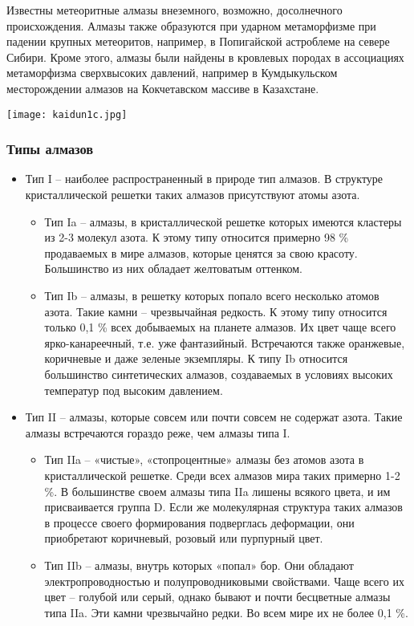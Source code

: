 \documentclass{beamer}
\begin{document}
 \begin{frame}
 Известны метеоритные алмазы внеземного, возможно, досолнечного происхождения. Алмазы также образуются при ударном метаморфизме при падении крупных метеоритов, например, в Попигайской астроблеме на севере Сибири.
Кроме этого, алмазы были найдены в кровлевых породах в ассоциациях метаморфизма сверхвысоких давлений, например в Кумдыкульском месторождении алмазов на Кокчетавском массиве в Казахстане.\par
 \centering\texttt{[image: kaidun1c.jpg]}\par
 \end{frame}
 
 \begin{frame}
 \frametitle{Типы алмазов}
 \begin{itemize}
 \item Тип I – наиболее распространенный в природе тип алмазов. В структуре кристаллической решетки таких алмазов присутствуют атомы азота.
 \begin{itemize}
 \item Тип Ia – алмазы, в кристаллической решетке которых имеются кластеры из 2-3 молекул азота. К этому типу относится примерно 98 \% продаваемых в мире алмазов, которые ценятся за свою красоту. Большинство из них обладает желтоватым оттенком.
 \item Тип Ib – алмазы, в решетку которых попало всего несколько атомов азота. Такие камни – чрезвычайная редкость. К этому типу относится только 0,1 \% всех добываемых на планете алмазов. Их цвет чаще всего ярко-канареечный, т.е. уже фантазийный. Встречаются также оранжевые, коричневые и даже зеленые экземпляры. К типу Ib относится большинство синтетических алмазов, создаваемых в условиях высоких температур под высоким давлением.
 \end{itemize}
 \end{itemize}
 \end{frame}
 
 \begin{frame}
 \begin{itemize}
 \item Тип II – алмазы, которые совсем или почти совсем не содержат азота. Такие алмазы встречаются гораздо реже, чем алмазы типа I.
 \begin{itemize}
 \item Тип IIa – «чистые», «стопроцентные» алмазы без атомов азота в кристаллической решетке. Среди всех алмазов мира таких примерно 1-2 \%. В большинстве своем алмазы типа IIa лишены всякого цвета, и им присваивается группа D. Если же молекулярная структура таких алмазов в процессе своего формирования подверглась деформации, они приобретают коричневый, розовый или пурпурный цвет.
 \item Тип IIb – алмазы, внутрь которых «попал» бор. Они обладают электропроводностью и полупроводниковыми свойствами. Чаще всего их цвет – голубой или серый, однако бывают и почти бесцветные алмазы типа IIa. Эти камни чрезвычайно редки. Во всем мире их не более 0,1 \%.
 \end{itemize}
 \end{itemize}
 \end{frame}
 
\end{document}
